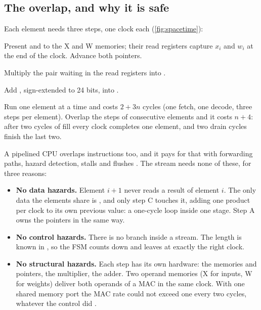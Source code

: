 \subsection{The overlap, and why it is safe}


Each element needs three steps, one clock each (\cref{fig:spacetime}):
\begin{description}[leftmargin=1.6em,style=nextline,itemsep=0.2em]
\item[A, address] Present  and  to the X and W memories; their read registers capture $x_i$ and $w_i$ at the end of the clock. Advance both pointers.
\item[M, multiply] Multiply the pair waiting in the read registers into .
\item[C, accumulate] Add , sign-extended to 24 bits, into .
\end{description}
Run one element at a time and  costs $2 + 3n$ cycles (one fetch, one decode, three steps per element). Overlap the steps of consecutive elements and it costs $n + 4$: after two cycles of fill every clock completes one element, and two drain cycles finish the last two.

A pipelined CPU overlaps instructions too, and it pays for that with forwarding paths, hazard detection, stalls and flushes \citep{harris2013ddca}. The stream needs none of these, for three reasons:
\begin{itemize}
\item \textbf{No data hazards.} Element $i+1$ never reads a result of element $i$. The only data the elements share is , and only step C touches it, adding one product per clock to its own previous value: a one-cycle loop inside one stage. Step A owns the pointers in the same way.
\item \textbf{No control hazards.} There is no branch inside a stream. The length is known in , so the FSM counts down and leaves  at exactly the right clock.
\item \textbf{No structural hazards.} Each step has its own hardware: the memories and pointers, the multiplier, the adder. Two operand memories (X for inputs, W for weights) deliver both operands of a MAC in the same clock. With one shared memory port the MAC rate could not exceed one every two cycles, whatever the control did \citep{williams2009roofline,kung1982systolic}.
\end{itemize}

